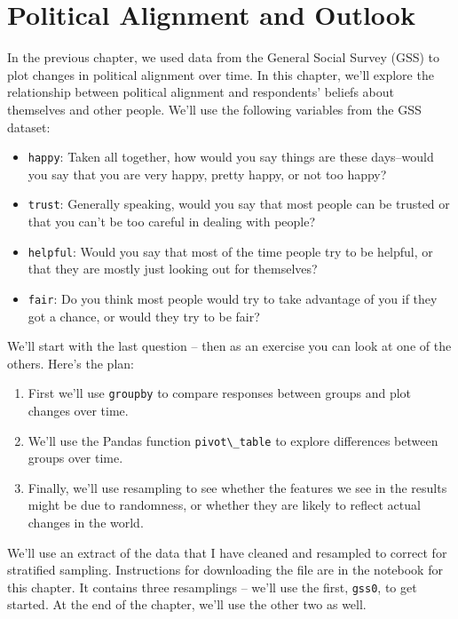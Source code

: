 \chapter{Political Alignment and
Outlook}\label{political-alignment-and-outlook}

In the previous chapter, we used data from the General Social Survey
(GSS) to plot changes in political alignment over time. In this chapter,
we'll explore the relationship between political alignment and
respondents' beliefs about themselves and other people. We'll use the
following variables from the GSS dataset:

\begin{itemize}
\item
  \passthrough{\lstinline!happy!}: Taken all together, how would you say
  things are these days--would you say that you are very happy, pretty
  happy, or not too happy?
\item
  \passthrough{\lstinline!trust!}: Generally speaking, would you say
  that most people can be trusted or that you can't be too careful in
  dealing with people?
\item
  \passthrough{\lstinline!helpful!}: Would you say that most of the time
  people try to be helpful, or that they are mostly just looking out for
  themselves?
\item
  \passthrough{\lstinline!fair!}: Do you think most people would try to
  take advantage of you if they got a chance, or would they try to be
  fair?
\end{itemize}

We'll start with the last question -- then as an exercise you can look
at one of the others. Here's the plan:

\begin{enumerate}
\def\labelenumi{\arabic{enumi}.}
\item
  First we'll use \passthrough{\lstinline!groupby!} to compare responses
  between groups and plot changes over time.
\item
  We'll use the Pandas function \passthrough{\lstinline!pivot\_table!}
  to explore differences between groups over time.
\item
  Finally, we'll use resampling to see whether the features we see in
  the results might be due to randomness, or whether they are likely to
  reflect actual changes in the world.
\end{enumerate}

We'll use an extract of the data that I have cleaned and resampled to
correct for stratified sampling. Instructions for downloading the file
are in the notebook for this chapter. It contains three resamplings --
we'll use the first, \passthrough{\lstinline!gss0!}, to get started. At
the end of the chapter, we'll use the other two as well.

